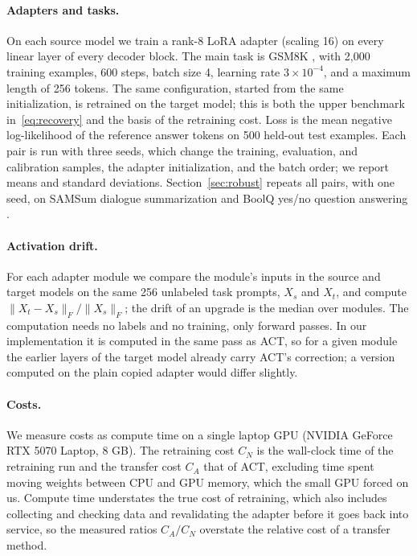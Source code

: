 \documentclass[preprint,12pt,authoryear]{elsarticle}
\begin{document}
\paragraph{Adapters and tasks.} On each source model we train a rank-8 LoRA adapter (scaling 16) on every linear layer of every decoder block. The main task is GSM8K \citep{cobbe2021gsm8k}, with 2{,}000 training examples, 600 steps, batch size 4, learning rate $3\times10^{-4}$, and a maximum length of 256 tokens. The same configuration, started from the same initialization, is retrained on the target model; this is both the upper benchmark in~\eqref{eq:recovery} and the basis of the retraining cost. Loss is the mean negative log-likelihood of the reference answer tokens on 500 held-out test examples. Each pair is run with three seeds, which change the training, evaluation, and calibration samples, the adapter initialization, and the batch order; we report means and standard deviations. Section~\ref{sec:robust} repeats all pairs, with one seed, on SAMSum dialogue summarization \citep{gliwa2019samsum} and BoolQ yes/no question answering \citep{clark2019boolq}.

\paragraph{Activation drift.} For each adapter module we compare the module's inputs in the source and target models on the same 256 unlabeled task prompts, $X_s$ and $X_t$, and compute $\|X_t-X_s\|_F/\|X_s\|_F$; the drift of an upgrade is the median over modules. The computation needs no labels and no training, only forward passes. In our implementation it is computed in the same pass as ACT, so for a given module the earlier layers of the target model already carry ACT's correction; a version computed on the plain copied adapter would differ slightly.

\paragraph{Costs.} We measure costs as compute time on a single laptop GPU (NVIDIA GeForce RTX 5070 Laptop, 8 GB). The retraining cost $C_N$ is the wall-clock time of the retraining run and the transfer cost $C_A$ that of ACT, excluding time spent moving weights between CPU and GPU memory, which the small GPU forced on us. Compute time understates the true cost of retraining, which also includes collecting and checking data and revalidating the adapter before it goes back into service, so the measured ratios $C_A/C_N$ overstate the relative cost of a transfer method.
\end{document}
